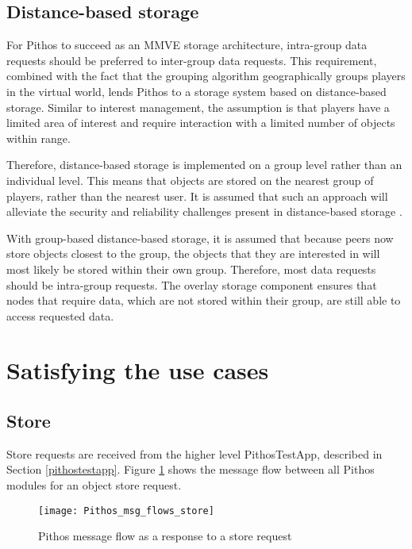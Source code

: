 \subsection{Distance-based storage}
For Pithos to succeed as an MMVE storage architecture, intra-group data requests should be preferred to inter-group data requests. This requirement, combined with the fact that the grouping algorithm geographically groups players in the virtual world, lends Pithos to a storage system based on distance-based storage. Similar to interest management, the assumption is that players have a limited area of interest and require interaction with a limited number of objects within range.

Therefore, distance-based storage is implemented on a group level rather than an individual level. This means that objects are stored on the nearest group of players, rather than the nearest user. It is assumed that such an approach will alleviate the security and reliability challenges present in distance-based storage \cite{gilmore_p2p_mmog_state_persistency}.

With group-based distance-based storage, it is assumed that because peers now store objects closest to the group, the objects that they are interested in will most likely be stored within their own group. Therefore, most data requests should be intra-group requests. The overlay storage component ensures that nodes that require data, which are not stored within their group, are still able to access requested data.

\section{Satisfying the use cases}
\subsection{Store}
    Store requests are received from the higher level PithosTestApp, described in Section \ref{pithostestapp}. Figure \ref{fig_pithos_msg_flow_store} shows the message flow between all Pithos modules for an object store request.

\begin{figure}[htbp]
 \centering
 \texttt{[image: Pithos\_msg\_flows\_store]}
 \caption{Pithos message flow as a response to a store request}
 \label{fig_pithos_msg_flow_store}
\end{figure}

